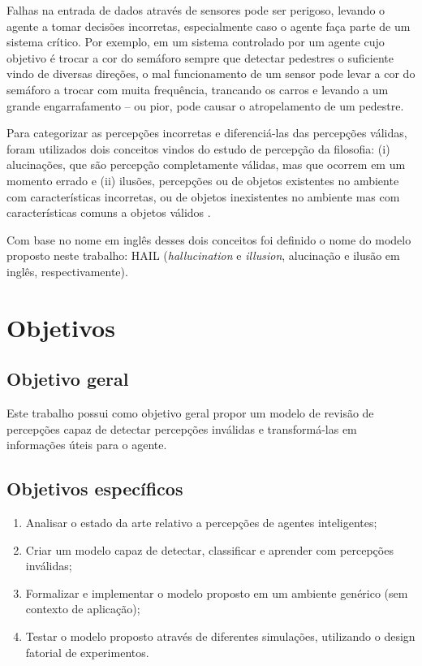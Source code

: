 Falhas na entrada de dados através de sensores pode ser perigoso, levando o agente a tomar decisões incorretas, especialmente caso o agente faça parte de um sistema crítico. Por exemplo, em um sistema controlado por um agente cujo objetivo é trocar a cor do semáforo sempre que detectar pedestres o suficiente vindo de diversas direções, o mal funcionamento de um sensor pode levar a cor do semáforo a trocar com muita frequência, trancando os carros e levando a um grande engarrafamento -- ou pior, pode causar o atropelamento de um pedestre.

Para categorizar as percepções incorretas e diferenciá-las das percepções válidas, foram utilizados dois conceitos vindos do estudo de percepção da filosofia: (i) alucinações, que são percepção completamente válidas, mas que ocorrem em um momento errado e (ii) ilusões, percepções ou de objetos existentes no ambiente com características incorretas, ou de objetos inexistentes no ambiente mas com características comuns a objetos válidos \cite{perception-problem}.

Com base no nome em inglês desses dois conceitos foi definido o nome do modelo proposto neste trabalho: HAIL (\textit{hallucination} e \textit{illusion}, alucinação e ilusão em inglês, respectivamente).

\section{Objetivos}

\subsection{Objetivo geral}

Este trabalho possui como objetivo geral propor um modelo de revisão de percepções capaz de detectar percepções inválidas e transformá-las em informações úteis para o agente.

\subsection{Objetivos específicos}

\begin{enumerate}
    \item Analisar o estado da arte relativo a percepções de agentes inteligentes;
    \item Criar um modelo capaz de detectar, classificar e aprender com percepções inválidas;
    \item Formalizar e implementar o modelo proposto em um ambiente genérico (sem contexto de aplicação);
        \item Testar o modelo proposto através de diferentes simulações, utilizando o design fatorial de experimentos. 
\end{enumerate}

